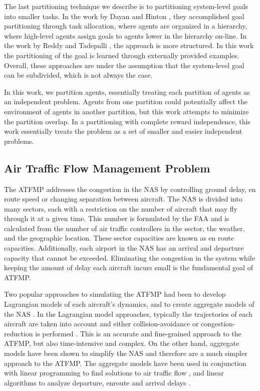 \documentclass{aamas2014}
\begin{document}
The last partitioning technique we describe is to partitioning system-level goals into smaller tasks. In the work by Dayan and Hinton \cite{Dayan93feudalreinforcement}, they accomplished goal partitioning through task allocation, where agents are organized in a hierarchy, where high-level agents assign goals to agents lower in the hierarchy on-line. In the work by Reddy and Tadepalli \cite{Reddy_learninggoal-decomposition}, the approach is more structured. In this work the partitioning of the goal is learned through externally provided examples. Overall, these approaches are under the assumption that the system-level goal can be subdivided, which is not always the case. 

In this work, we partition agents, essentially treating each partition of agents as an independent problem. Agents from one partition could potentially affect the environment of agents in another partition, but this work attempts to minimize the partition overlap. In a partitioning with complete reward independence, this work essentially treats the problem as a set of smaller and easier independent problems.


\subsection{Air Traffic Flow Management Problem}

The ATFMP addresses the congestion in the NAS by controlling ground delay, en route speed or changing separation between aircraft. The NAS is divided into many sectors, each with a restriction on the number of aircraft that may fly through it at a given time. This number is formulated by the FAA and is calculated from the number of air traffic controllers in the sector, the weather, and the geographic location. These sector capacities are known as en route capacities. Additionally, each airport in the NAS has an arrival and departure capacity that cannot be exceeded. Eliminating the congestion in the system while keeping the amount of delay each aircraft incurs small is the fundamental goal of ATFMP. 

Two popular approaches to simulating the ATFMP had been to develop Lagrangian models of each aircraft's dynamics, and to create aggregate models of the NAS \cite{Bertsimas:1998:ATF:767667.768027, Bilimoria, McNally, Mueller_analysisof}. In the Lagrangian model approaches, typically the trajectories of each aircraft are taken into account and either collision-avoidance or congestion-reduction is performed \cite{Bilimoria, McNally}. This is an accurate and fine-grained approach to the ATFMP, but also time-intensive and complex. On the other hand, aggregate models have been shown to simplify the NAS and therefore are a much simpler approach to the ATFMP. The aggregate models have been used in conjunction with linear programming to find solutions to air traffic flow \cite{Bertsimas:1998:ATF:767667.768027}, and linear algorithms to analyze departure, enroute and arrival delays \cite{Mueller_analysisof}.
\end{document}
